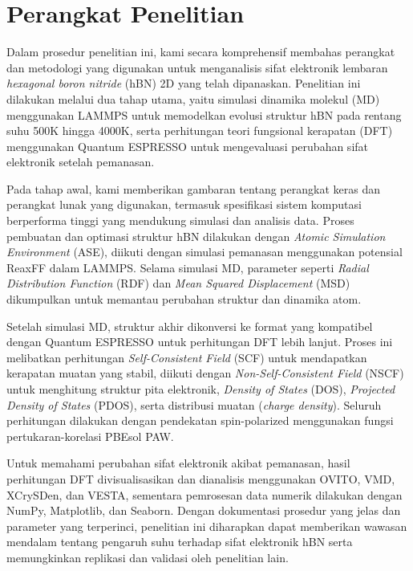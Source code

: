 \bigskip

\section{Perangkat Penelitian}
Dalam prosedur penelitian ini, kami secara komprehensif membahas perangkat dan metodologi yang digunakan untuk menganalisis sifat elektronik lembaran \textit{hexagonal boron nitride} (hBN) 2D yang telah dipanaskan. Penelitian ini dilakukan melalui dua tahap utama, yaitu simulasi dinamika molekul (MD) menggunakan LAMMPS untuk memodelkan evolusi struktur hBN pada rentang suhu 500K hingga 4000K, serta perhitungan teori fungsional kerapatan (DFT) menggunakan Quantum ESPRESSO untuk mengevaluasi perubahan sifat elektronik setelah pemanasan.

Pada tahap awal, kami memberikan gambaran tentang perangkat keras dan perangkat lunak yang digunakan, termasuk spesifikasi sistem komputasi berperforma tinggi yang mendukung simulasi dan analisis data. Proses pembuatan dan optimasi struktur hBN dilakukan dengan \textit{Atomic Simulation Environment} (ASE), diikuti dengan simulasi pemanasan menggunakan potensial ReaxFF dalam LAMMPS. Selama simulasi MD, parameter seperti \textit{Radial Distribution Function} (RDF) dan \textit{Mean Squared Displacement} (MSD) dikumpulkan untuk memantau perubahan struktur dan dinamika atom.

Setelah simulasi MD, struktur akhir dikonversi ke format yang kompatibel dengan Quantum ESPRESSO untuk perhitungan DFT lebih lanjut. Proses ini melibatkan perhitungan \textit{Self-Consistent Field} (SCF) untuk mendapatkan kerapatan muatan yang stabil, diikuti dengan \textit{Non-Self-Consistent Field} (NSCF) untuk menghitung struktur pita elektronik, \textit{Density of States} (DOS), \textit{Projected Density of States} (PDOS), serta distribusi muatan (\textit{charge density}). Seluruh perhitungan dilakukan dengan pendekatan spin-polarized menggunakan fungsi pertukaran-korelasi PBEsol PAW.

Untuk memahami perubahan sifat elektronik akibat pemanasan, hasil perhitungan DFT divisualisasikan dan dianalisis menggunakan OVITO, VMD, XCrySDen, dan VESTA, sementara pemrosesan data numerik dilakukan dengan NumPy, Matplotlib, dan Seaborn. Dengan dokumentasi prosedur yang jelas dan parameter yang terperinci, penelitian ini diharapkan dapat memberikan wawasan mendalam tentang pengaruh suhu terhadap sifat elektronik hBN serta memungkinkan replikasi dan validasi oleh penelitian lain.

